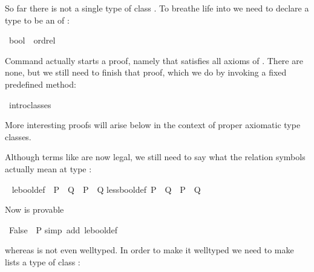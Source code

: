 \begin{isabellebody}
\begin{isamarkuptext}
So far there is not a single type of class . To breathe life
into  we need to declare a type to be an  of
:%
\end{isamarkuptext}%
\ bool\ {\isacharcolon}{\isacharcolon}\ ordrel%
\begin{isamarkuptxt}%
\noindent
Command  actually starts a proof, namely that
 satisfies all axioms of .
There are none, but we still need to finish that proof, which we do
by invoking a fixed predefined method:%
\end{isamarkuptxt}%
\ intro{\isacharunderscore}classes%
\begin{isamarkuptext}%
\noindent
More interesting  proofs will arise below
in the context of proper axiomatic type classes.

Although terms like  are now legal, we still need to say
what the relation symbols actually mean at type :%
\end{isamarkuptext}%
\ {\isacharparenleft}\isanewline
le{\isacharunderscore}bool{\isacharunderscore}def{\isacharcolon}\ \ {\isachardoublequote}P\ {\isacharless}{\isacharless}{\isacharequal}\ Q\ {\isasymequiv}\ P\ {\isasymlongrightarrow}\ Q{\isachardoublequote}\isanewline
less{\isacharunderscore}bool{\isacharunderscore}def{\isacharcolon}\ {\isachardoublequote}P\ {\isacharless}{\isacharless}\ Q\ {\isasymequiv}\ {\isasymnot}P\ {\isasymand}\ Q{\isachardoublequote}%
\begin{isamarkuptext}%
\noindent
Now  is provable%
\end{isamarkuptext}%
\ {\isachardoublequote}False\ {\isacharless}{\isacharless}{\isacharequal}\ P{\isachardoublequote}\isanewline
{}simp\ add{\isacharcolon}\ le{\isacharunderscore}bool{\isacharunderscore}def{\isacharparenright}%
\begin{isamarkuptext}%
\noindent
whereas \isa{{\isacharbrackleft}{\isacharbrackright}\ {\isacharless}{\isacharless}{\isacharequal}\ {\isacharbrackleft}{\isacharbrackright}} is not even welltyped. In order to make it welltyped
we need to make lists a type of class :%
\end{isamarkuptext}%
\end{isabellebody}%
